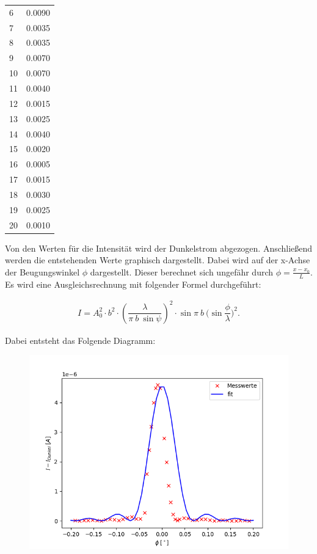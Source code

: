 \begin{minipage}{\linewidth}
\begin{table}[H]
\begin{tabular}{ll}
        6    &   0.0090  \\ 
        7    &   0.0035 \\ 
        8    &   0.0035 \\ 
        9    &   0.0070  \\ 
        10   &   0.0070  \\ 
        11   &   0.0040  \\ 
        12   &   0.0015 \\ 
        13   &   0.0025 \\ 
        14   &   0.0040  \\ 
        15   &   0.0020  \\ 
        16   &   0.0005 \\ 
        17   &   0.0015 \\ 
        18   &   0.0030  \\ 
        19   &   0.0025 \\ 
        20   &   0.0010  \\ 
        \bottomrule   
    \end{tabular}
    
    \label{tab:1}
\end{table}
\end{minipage}

Von den Werten für die Intensität wird der Dunkelstrom abgezogen. Anschließend werden die entstehenden Werte graphisch dargestellt. Dabei wird auf der x-Achse der Beugungswinkel $\phi$ dargestellt. Dieser berechnet sich ungefähr durch $\phi = \frac{x-x_0}{L}$. Es wird eine Ausgleichsrechnung mit folgender Formel durchgeführt:

\begin{align*}
    I=A_0^2\cdot b^2\cdot (\dfrac{\lambda}{\pi \ b \ \sin{\psi}})^2 \cdot \sin{\pi \ b \ (\sin{\dfrac{\phi}{\lambda}}})^2.
\end{align*}

Dabei entsteht das Folgende Diagramm:

\begin{figure}[H]
    \centering
    \includegraphics{einzel.png}
\end{figure}

